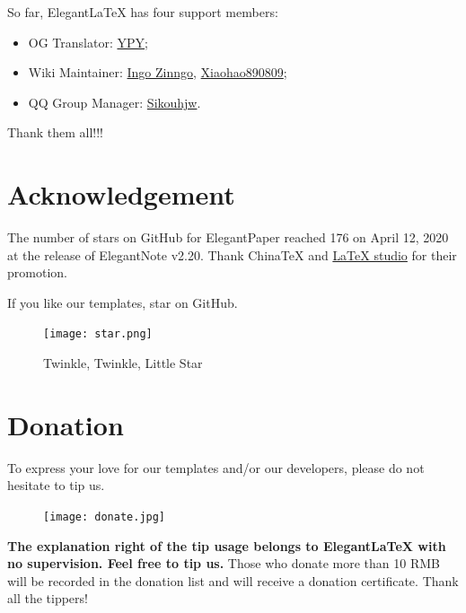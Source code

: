 \documentclass[en,hazy,device=normal,blue,14pt]{elegantnote}
\begin{document}
So far, Elegant\LaTeX{} has four support members:
\begin{itemize}
	\item OG Translator: \href{https://github.com/peggy2006xzyz}{YPY};
	\item Wiki Maintainer: \href{https://github.com/izinngo}{Ingo Zinngo}, \href{https://github.com/xiaohao890809}{Xiaohao890809};
	\item QQ Group Manager: \href{https://github.com/sikouhjw}{Sikouhjw}.
\end{itemize}

Thank them all!!!

\section{Acknowledgement}
The number of stars on GitHub for ElegantPaper reached 176 on April 12, 2020 at the release of ElegantNote v2.20.
Thank China\TeX{} and \href{http://www.latexstudio.net/}{\LaTeX{} studio} for their promotion. 

If you like our templates, star on GitHub.
\begin{figure}[!ht]
	\centering
	\texttt{[image: star.png]}
	\caption{Twinkle, Twinkle, Little Star}
\end{figure}

\section{Donation}
To express your love for our templates and/or our developers, please do not hesitate to tip us.
\begin{figure}[!htbp]
	\centering
	\texttt{[image: donate.jpg]}
\end{figure}

\textbf{The explanation right of the tip usage belongs to Elegant\LaTeX{} with no supervision. Feel free to tip us.} Those who donate more than 10 RMB will be recorded in the donation list and will receive a donation certificate. Thank all the tippers!
\end{document}
